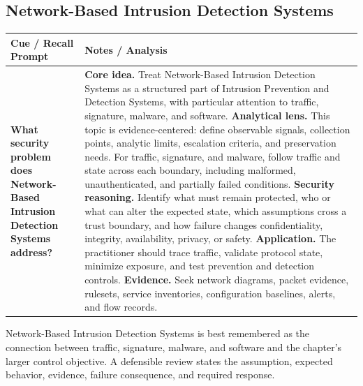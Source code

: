 \documentclass[11pt]{article}
\newcommand{\CornellHeader}{%
\rowcolor{Navy}\color{white}\bfseries Cue / Recall Prompt & \color{white}\bfseries Notes / Analysis\\\hline}
\newcommand{\CornellRow}[2]{%
\cellcolor{CueGray}\RaggedRight\textbf{#1} & \RaggedRight #2\\\hline}
\begin{document}
\subsection*{Network-Based Intrusion Detection Systems}
\begin{longtable}{>{\RaggedRight\arraybackslash}p{}|>{\RaggedRight\arraybackslash}p{}}
\CornellHeader
\CornellRow{What security problem does Network-Based Intrusion Detection Systems address?}{\textbf{Core idea.} Treat Network-Based Intrusion Detection Systems as a structured part of Intrusion Prevention and Detection Systems, with particular attention to traffic, signature, malware, and software. \textbf{Analytical lens.} This topic is evidence-centered: define observable signals, collection points, analytic limits, escalation criteria, and preservation needs. For traffic, signature, and malware, follow traffic and state across each boundary, including malformed, unauthenticated, and partially failed conditions. \textbf{Security reasoning.} Identify what must remain protected, who or what can alter the expected state, which assumptions cross a trust boundary, and how failure changes confidentiality, integrity, availability, privacy, or safety. \textbf{Application.} The practitioner should trace traffic, validate protocol state, minimize exposure, and test prevention and detection controls. \textbf{Evidence.} Seek network diagrams, packet evidence, rulesets, service inventories, configuration baselines, alerts, and flow records.}
\end{longtable}
\begin{topicsummary}
Network-Based Intrusion Detection Systems is best remembered as the connection between traffic, signature, malware, and software and the chapter's larger control objective. A defensible review states the assumption, expected behavior, evidence, failure consequence, and required response.
\end{topicsummary}
\end{document}
